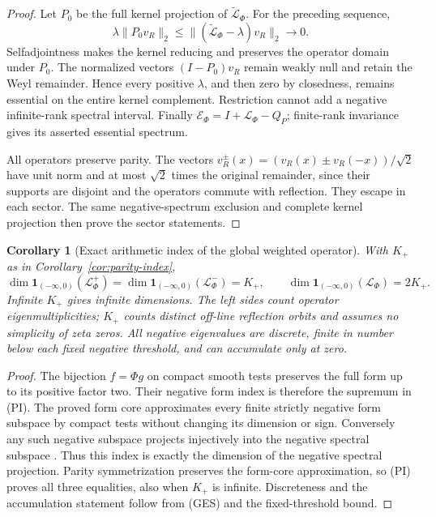 \documentclass[11pt]{article}
\newtheorem{corollary}[theorem]{Corollary}
\theoremstyle{remark}\newtheorem{remark}[theorem]{Remark}
\begin{document}
\begin{proof}
Let $P_0$ be the full kernel projection of
$\widetilde{\mathcal L}_\Phi$. For the preceding sequence,
\[
 \lambda\|P_0v_R\|_2
 \le\|(\widetilde{\mathcal L}_\Phi-\lambda)v_R\|_2\to0.
\]
Selfadjointness makes the kernel reducing and preserves the
operator domain under $P_0$. The normalized vectors
$(I-P_0)v_R$ remain weakly null and retain the Weyl remainder.
Hence every positive $\lambda$, and then zero by closedness,
remains essential on the entire kernel complement. Restriction
cannot add a negative infinite-rank spectral interval.
Finally $\mathcal E_\Phi=I+\mathcal L_\Phi-Q_P$;
finite-rank invariance \cite[Lemma 6.18, p.~146]{TeschlQM2009}
gives its asserted essential spectrum.

All operators preserve parity. The vectors
$v_R^\pm(x)=(v_R(x)\pm v_R(-x))/\sqrt2$ have unit norm
and at most $\sqrt2$ times the original remainder, since their
supports are disjoint and the operators commute with reflection.
They escape in each sector. The same negative-spectrum exclusion
and complete kernel projection then prove the sector statements.
\end{proof}

\begin{corollary}[Exact arithmetic index of the global weighted operator]
\label{cor:theta-global-index}
With $K_+$ as in Corollary~\ref{cor:parity-index},
\[
 \dim\mathbf1_{(-\infty,0)}(\mathcal L_\Phi^+)
 =\dim\mathbf1_{(-\infty,0)}(\mathcal L_\Phi^-)=K_+,\qquad
 \dim\mathbf1_{(-\infty,0)}(\mathcal L_\Phi)=2K_+.         \tag{GNI}
\]
Infinite $K_+$ gives infinite dimensions. The left sides count
operator eigenmultiplicities; $K_+$ counts distinct off-line
reflection orbits and assumes no simplicity of zeta zeros.
All negative eigenvalues are discrete, finite in number below
each fixed negative threshold, and can accumulate only at zero.
\end{corollary}
\begin{proof}
The bijection $f=\Phi g$ on compact smooth tests preserves the
full form up to its positive factor two. Their negative form
index is therefore the supremum in (PI). The proved form core
approximates every finite strictly negative form subspace by
compact tests without changing its dimension or sign.
Conversely any such negative subspace projects injectively into
the negative spectral subspace
\cite[Theorem 4.12(i), p.~119]{TeschlQM2009}.
Thus this index is exactly the dimension of the negative spectral
projection. Parity symmetrization preserves the form-core
approximation, so (PI) proves all three equalities, also when
$K_+$ is infinite. Discreteness and the accumulation statement
follow from (GES) and the fixed-threshold bound.
\end{proof}
\end{document}
